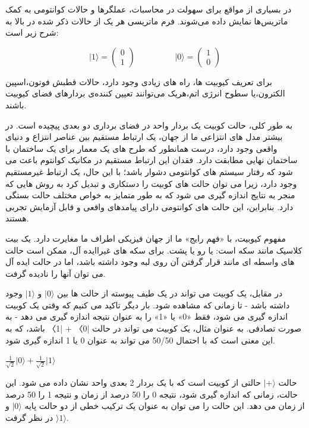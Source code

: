 \documentclass{book}
\begin{document}
در بسیاری از مواقع برای سهولت در محاسبات، عملگر‌ها و حالات کوانتومی به کمک ماتریس‌ها نمایش داده ‌می‌شوند. فرم ماتریسی هر یک از حالات ذکر شده در بالا به شرح زیر است:

\begin{equation}
	\vert 1 \rangle = \begin{pmatrix} 0 \\ 1 \end{pmatrix}
	\hspace{2cm}
	\vert 0 \rangle = \begin{pmatrix} 1 \\ 0 \end{pmatrix}	
\end{equation}

برای تعریف کیوبیت ها، راه های زیادی وجود دارد، حالات قطبش فوتون،‌اسپین الکترون،‌یا سطوح انرژی اتم،‌هریک می‌توانند تعیین کننده‌ی بردار‌های فضای کیوبیت باشند.

 به طور کلی، حالت کوبیت یک بردار واحد در فضای برداری دو بعدی پیچیده است.
در بیشتر مدل های انتزاعی ما از جهان، یک ارتباط مستقیم بین عناصر انتزاع و دنیای واقعی وجود دارد، درست همانطور که طرح های یک معمار برای یک ساختمان با ساختمان نهایی مطابقت دارد. فقدان این ارتباط مستقیم در مکانیک کوانتوم باعث می شود که رفتار سیستم های کوانتومی دشوار باشد؛ با این حال، یک ارتباط غیرمستقیم وجود دارد، زیرا می توان حالت های کوبیت را دستکاری و تبدیل کرد به روش هایی که منجر به نتایج اندازه گیری می شود که به طور متمایز به خواص مختلف حالت بستگی دارد. بنابراین، این حالت های کوانتومی دارای پیامدهای واقعی و قابل آزمایش تجربی هستند.

مفهوم کیوبیت، با «فهم رایج» ما از جهان فیزیکی اطراف ما مغایرت دارد. یک بیت کلاسیک مانند سکه است: یا رو یا پشت. برای سکه های غیراایده آل، ممکن است حالت های واسطه ای مانند قرار گرفتن آن روی لبه وجود داشته باشد، اما در حالت ایده آل می توان آنها را نادیده گرفت. 

در مقابل، یک کوبیت می تواند در یک طیف پیوسته از حالت ها بین $\vert0\rangle$ و $\vert1\rangle$ وجود داشته باشد - تا زمانی که مشاهده شود. بار دیگر تاکید می کنیم که وقتی یک کوبیت اندازه گیری می شود، فقط «0» یا «1» را به عنوان نتیجه اندازه گیری می دهد - به صورت تصادفی. به عنوان مثال، یک کوبیت می تواند در حالت |0〉 + |1〉 باشد، که به این معنی است که با احتمال 50/50 می تواند به عنوان 0 یا 1 اندازه گیری شود.


\begin{center}
	$\frac{1}{\sqrt{2}} \vert 0\rangle + \frac{1}{\sqrt{2}} \vert 1\rangle$
\end{center}

حالت $\vert+\rangle$ حالتی از کوبیت است که با یک بردار 2 بعدی واحد نشان داده می شود. این حالت، زمانی که اندازه گیری شود، نتیجه 0 را 50 درصد از زمان و نتیجه 1 را 50 درصد از زمان می دهد. این حالت را می توان به عنوان یک ترکیب خطی از دو حالت پایه $\vert0\rangle$ و $\rangle1\rangle$ در نظر گرفت.
\end{document}
